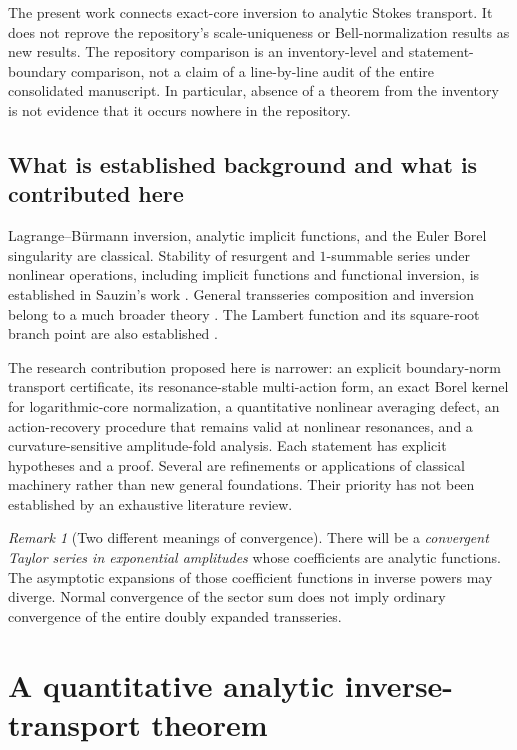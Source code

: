 \documentclass[11pt,a4paper]{article}
\numberwithin{equation}{section}
\theoremstyle{definition}
\theoremstyle{remark}
\newtheorem{remark}[theorem]{Remark}
\begin{document}
The present work connects exact-core inversion to analytic Stokes transport. It does not reprove the repository's scale-uniqueness or Bell-normalization results as new results. The repository comparison is an inventory-level and statement-boundary comparison, not a claim of a line-by-line audit of the entire consolidated manuscript. In particular, absence of a theorem from the inventory is not evidence that it occurs nowhere in the repository.

\subsection{What is established background and what is contributed here}
Lagrange--B\"urmann inversion, analytic implicit functions, and the Euler Borel singularity are classical. Stability of resurgent and $1$-summable series under nonlinear operations, including implicit functions and functional inversion, is established in Sauzin's work \cite{sauzin2015,sauzin2014}. General transseries composition and inversion belong to a much broader theory \cite{edgar}. The Lambert function and its square-root branch point are also established \cite{dlmf}.

The research contribution proposed here is narrower: an explicit boundary-norm transport certificate, its resonance-stable multi-action form, an exact Borel kernel for logarithmic-core normalization, a quantitative nonlinear averaging defect, an action-recovery procedure that remains valid at nonlinear resonances, and a curvature-sensitive amplitude-fold analysis. Each statement has explicit hypotheses and a proof. Several are refinements or applications of classical machinery rather than new general foundations. Their priority has not been established by an exhaustive literature review.

\begin{remark}[Two different meanings of convergence]
There will be a \emph{convergent Taylor series in exponential amplitudes} whose coefficients are analytic functions. The asymptotic expansions of those coefficient functions in inverse powers may diverge. Normal convergence of the sector sum does not imply ordinary convergence of the entire doubly expanded transseries.
\end{remark}

\section{A quantitative analytic inverse-transport theorem}
\label{sec:transport}
\end{document}
